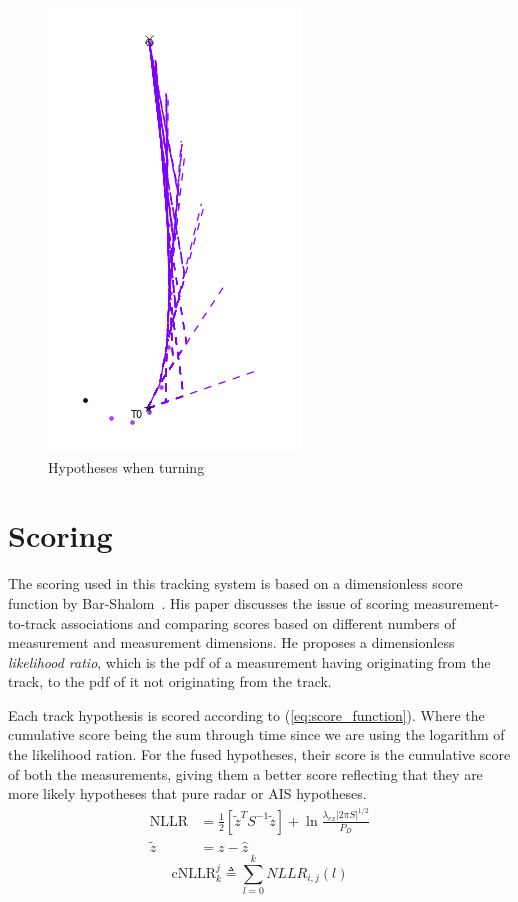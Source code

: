 \begin{figure}[H]
\centering
\includegraphics[height = .3\textheight]{Figures/Hypotheses_when_turning.PNG}
\caption{Hypotheses when turning}\label{fig:hypotheses_when_turning}
\end{figure}

\section{Scoring}
The scoring used in this tracking system is based on a dimensionless score function by Bar-Shalom~\cite{Bar-Shalom2007}. His paper discusses the issue of scoring measurement-to-track associations and comparing scores based on different numbers of measurement and measurement dimensions. He proposes a dimensionless \emph{likelihood ratio}, which is the \gls{pdf} of a measurement having originating from the track, to the \gls{pdf} of it not originating from the track.~

Each \gls{track hypothesis} is scored according to (\ref{eq:score_function}). Where the cumulative score being the sum through time since we are using the logarithm of the likelihood ration. For the fused hypotheses, their score is the cumulative score of both the measurements, giving them a better score reflecting that they are more likely hypotheses that pure radar or AIS hypotheses. 
\begin{equation}\label{eq:score_function}
\begin{split}
\mathrm{NLLR} &= \frac{1}{2} \left[ {\tilde{z}}^{T} {S}^{-1} \tilde{z} \right] + \ln \frac{\lambda_{ex} |2 \pi S|^{1/2}} {P_D} \\				
\tilde{z} &= z -\hat{z}
\end{split}
\end{equation}
\begin{equation}
\mathrm{cNLLR}_k^j \triangleq \sum_{l=0}^k NLLR_{i,j}(l)
\end{equation}

